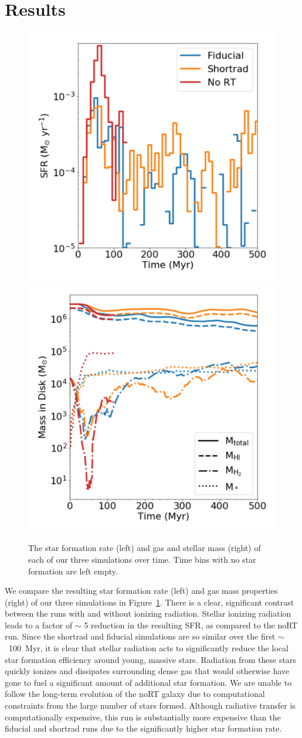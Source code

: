 \documentclass[twocolumn]{aastex62}
\begin{document}
\section{Results} \label{sec:results}

\begin{figure}
\centering
\includegraphics[width=0.49\linewidth]{sfr}
\includegraphics[width=0.49\linewidth]{mass}
\caption{The star formation rate (left) and gas and stellar mass (right) of each of our three simulations over time. Time bins with no star formation are left empty. }
\label{fig:sfr_mass_evolution}
\end{figure}

We compare the resulting star formation rate (left) and gas mass properties (right) of our three simulations in Figure~\ref{fig:sfr_mass_evolution}. There is a clear, significant contrast between the runs with and without ionizing radiation. Stellar ionizing radiation leads to a factor of $\sim$ 5 reduction in the resulting SFR, as compared to the noRT run. Since the shortrad and fiducial simulations are so similar over the first $\sim$~100~Myr, it is clear that stellar radiation acts to significantly reduce the local star formation efficiency around young, massive stars. Radiation from these stars quickly ionizes and dissipates surrounding dense gas that would otherwise have gone to fuel a significant amount of additional star formation. We are unable to follow the long-term evolution of the noRT galaxy due to computational constraints from the large number of stars formed. Although radiative transfer is computationally expensive, this run is substantially more expensive than the fiducial and shortrad runs due to the significantly higher star formation rate.
\end{document}
